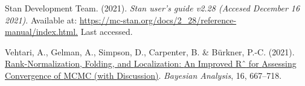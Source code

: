\documentclass[
  12pt,
  letterpaper,
  DIV=11,
  numbers=noendperiod]{scrartcl}
\newlength{\cslhangindent}
\newlength{\cslentryspacingunit} %
\newenvironment{CSLReferences}[2] %
 {%
  \setlength{\parindent}{0pt}
  \ifodd #1
  \let\oldpar\par
  \def\par{\hangindent=\cslhangindent\oldpar}
  \fi
  \setlength{\parskip}{#2\cslentryspacingunit}
 }%
 {}
\begin{document}
\begin{CSLReferences}{1}{0}
\leavevmode{}%
Stan Development Team. (2021). \emph{Stan user's guide v2.28 ({Accesed
December} 16 2021)}. Available at:
\href{https://mc-stan.org/docs/2_28/reference-manual/index.html}{https://mc-stan.org/docs/2\_28/reference-manual/index.html.}
Last accessed.

\leavevmode{}%
Vehtari, A., Gelman, A., Simpson, D., Carpenter, B. \& Bürkner, P.-C.
(2021). \href{https://doi.org/10.1214/20-BA1221}{Rank-{Normalization},
{Folding}, and {Localization}: {An Improved Rˆ} for {Assessing
Convergence} of {MCMC} (with {Discussion})}. \emph{Bayesian Analysis},
16, 667--718.

\end{CSLReferences}
\end{document}
